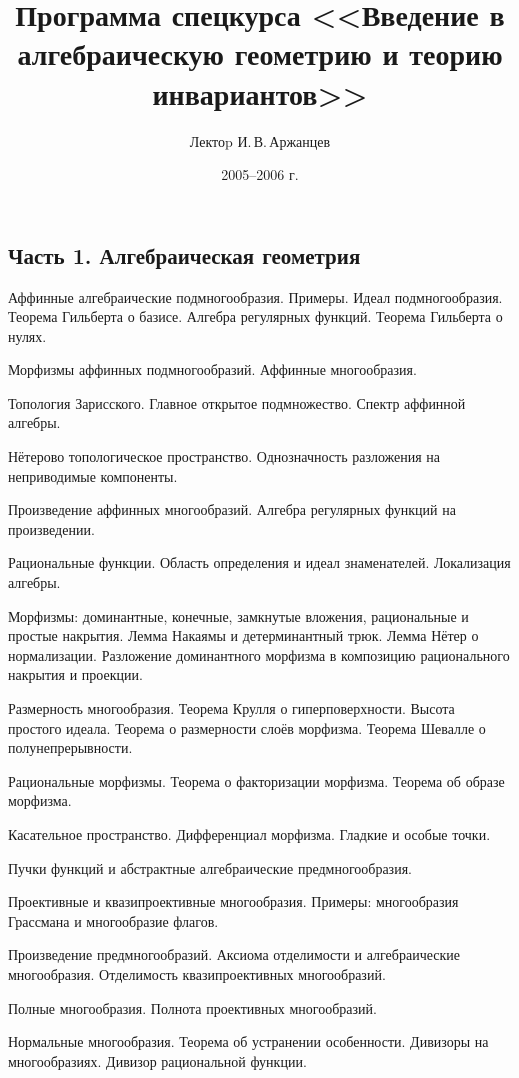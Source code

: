 \documentclass[a4paper]{article}
\title{Программа спецкурса <<Введение в алгебраическую геометрию и теорию инвариантов>>}
\author{Лектоp И.\,В.\,Аржанцев}
\date{2005--2006 г.}
\begin{document}
\maketitle

\subsection*{Часть 1. Алгебраическая геометрия}

\begin{nums}{0}
\item Аффинные алгебраические подмногообразия. Примеры. Идеал подмногообразия.
      Теорема Гильберта о базисе. Алгебра регулярных функций. Теорема Гильберта о нулях.
\item Морфизмы аффинных подмногообразий. Аффинные многообразия.
\item Топология Зарисского. Главное открытое подмножество. Спектр аффинной алгебры.
\item Нётерово топологическое пространство. Однозначность разложения на неприводимые компоненты.
\item Произведение аффинных многообразий. Алгебра регулярных функций на произведении.
\item Рациональные функции. Область определения и идеал знаменателей. Локализация алгебры.
\item Морфизмы: доминантные, конечные, замкнутые вложения, рациональные и простые накрытия.
      Лемма Накаямы и детерминантный трюк. Лемма Нётер о нормализации.
      Разложение доминантного морфизма в композицию рационального накрытия и проекции.
\item Размерность многообразия. Теорема Крулля о гиперповерхности. Высота простого идеала.
      Теорема о размерности слоёв морфизма. Теорема Шевалле о полунепрерывности.
\item Рациональные морфизмы. Теорема о факторизации морфизма. Теорема об образе морфизма.
\item Касательное пространство. Дифференциал морфизма. Гладкие и особые точки.
\item Пучки функций и абстрактные алгебраические предмногообразия.
\item Проективные и квазипроективные многообразия. Примеры: многообразия Грассмана и многообразие флагов.
\item Произведение предмногообразий. Аксиома отделимости и алгебраические многообразия.
      Отделимость квазипроективных многообразий.
\item Полные многообразия. Полнота проективных многообразий.
\item Нормальные многообразия. Теорема об устранении особенности. Дивизоры на многообразиях.
      Дивизор рациональной функции.
\end{nums}
\end{document}
